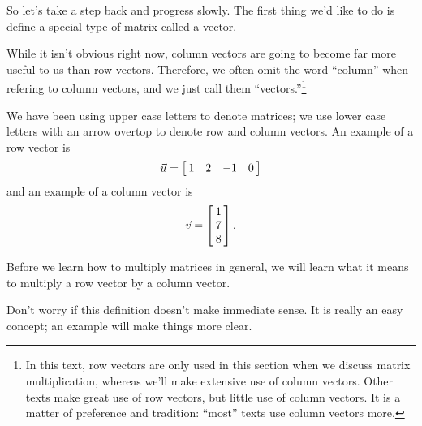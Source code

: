 So let's take a step back and progress slowly. The first thing we'd like to do is define a special type of matrix called a vector.


While it isn't obvious right now, column vectors are going to become far more useful to us than row vectors. Therefore, we often omit the word ``column'' when refering to column vectors, and we just call them ``vectors.''\footnote{In this text, row vectors are only used in this section when we discuss matrix multiplication, whereas we'll make extensive use of column vectors. Other texts make great use of row vectors, but little use of column vectors. It is a matter of preference and tradition: ``most'' texts use column vectors more.} 

We have been using upper case letters to denote matrices; we use lower case letters with an arrow overtop to denote row and column vectors. An example of a row vector is $$\vu = \bmx{cccc}1&2&-1&0\emx$$ and an example of a column vector is $$\vv = \bmx{c} 1\\7\\8\emx.$$

Before we learn how to multiply matrices in general, we will learn what it means to multiply a row vector by a column vector.%


Don't worry if this definition doesn't make immediate sense. It is really an easy concept; an example will make things more clear.\\


